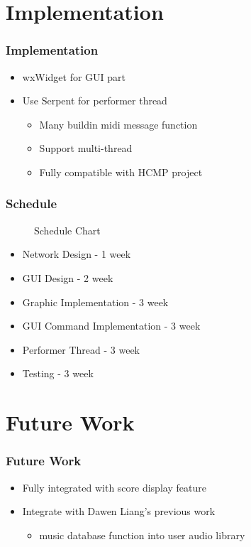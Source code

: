\documentclass[t]{beamer}
\begin{document}
\section{Implementation}
\begin{frame}
\frametitle{Implementation}
\begin{itemize}
  \item wxWidget for GUI part   
  \item Use Serpent for performer thread 
  \begin{itemize}
    \item Many buildin midi message function 
    \item Support multi-thread 
    \item Fully compatible with HCMP project
  \end{itemize}
\end{itemize}
\end{frame}

\begin{frame}
\frametitle{Schedule}
\begin{figure}[H] %
\caption{Schedule Chart}
\label{fig:speciation}
\end{figure}

\begin{itemize}
  \item Network Design - 1 week   
  \item GUI Design - 2 week 
  \item Graphic Implementation - 3 week 
  \item GUI Command Implementation - 3 week
  \item Performer Thread - 3 week
  \item Testing - 3 week
\end{itemize}
\end{frame}

\section{Future Work}
\begin{frame}
\frametitle{Future Work}
\begin{itemize}
  \item Fully integrated with score display feature 
  \item Integrate with Dawen Liang's previous work
    \begin{itemize}
      \item music database function into user audio library  
    \end{itemize}
\end{itemize}
\end{frame}
\end{document}
